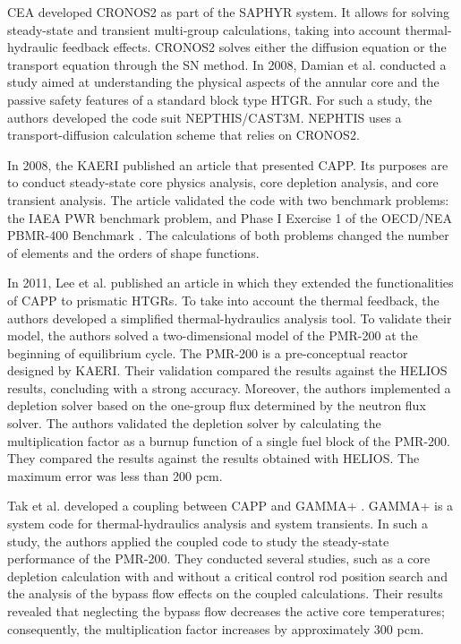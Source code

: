 \gls{CEA} developed CRONOS2 \cite{lautard_cronos_1990} as part of the SAPHYR system.
It allows for solving steady-state and transient multi-group calculations, taking into account thermal-hydraulic feedback effects.
CRONOS2 solves either the diffusion equation or the transport equation through the SN method.
In 2008, Damian et al. \cite{damian_vhtr_2008} conducted a study aimed at understanding the physical aspects of the annular core and the passive safety features of a standard block type \gls{HTGR}.
For such a study, the authors developed the code suit NEPTHIS/CAST3M.
NEPHTIS uses a transport-diffusion calculation scheme that relies on CRONOS2.

In 2008, the \gls{KAERI} published an article \cite{lee_development_2008} that presented CAPP.
Its purposes are to conduct steady-state core physics analysis, core depletion analysis, and core transient analysis.
The article validated the code with two benchmark problems: the IAEA PWR benchmark problem, and Phase I Exercise 1 of the OECD/NEA PBMR-400 Benchmark \cite{reitsma_oecd-neansc_2008}.
The calculations of both problems changed the number of elements and the orders of shape functions.

In 2011, Lee et al. published an article \cite{lee_development_2011} in which they extended the functionalities of CAPP to prismatic \glspl{HTGR}.
To take into account the thermal feedback, the authors developed a simplified thermal-hydraulics analysis tool.
To validate their model, the authors solved a two-dimensional model of the PMR-200 at the beginning of equilibrium cycle.
The PMR-200 is a pre-conceptual reactor designed by \gls{KAERI}.
Their validation compared the results against the HELIOS\cite{stammler_helios_1998} results, concluding with a strong accuracy.
Moreover, the authors implemented a depletion solver based on the one-group flux determined by the neutron flux solver.
The authors validated the depletion solver by calculating the multiplication factor as a burnup function of a single fuel block of the PMR-200.
They compared the results against the results obtained with HELIOS.
The maximum error was less than 200 pcm.

Tak et al. \cite{tak_cappgamma_2016} developed a coupling between CAPP and GAMMA+ \cite{lim_gamma_2006}.
GAMMA+ is a system code for thermal-hydraulics analysis and system transients.
In such a study, the authors applied the coupled code to study the steady-state performance of the PMR-200.
They conducted several studies, such as a core depletion calculation with and without a critical control rod position search and the analysis of the bypass flow effects on the coupled calculations.
Their results revealed that neglecting the bypass flow decreases the active core temperatures; consequently, the multiplication factor increases by approximately 300 pcm.

